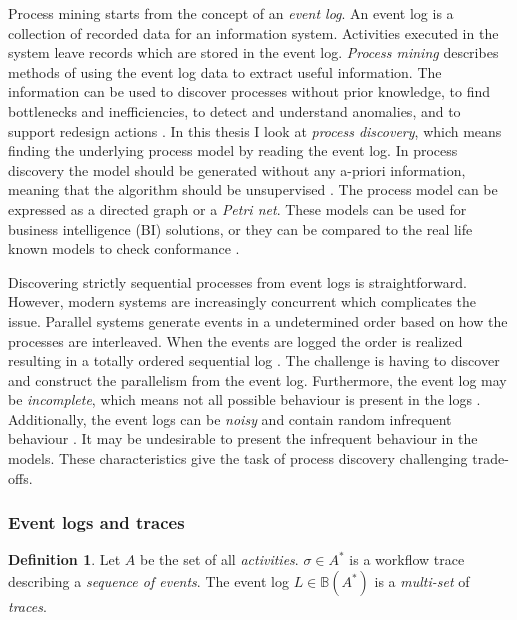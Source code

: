 \documentclass[english,12pt,a4paper,pdftex,sci,utf8]{aaltothesis}
\theoremstyle{definition}
\newtheorem{definition}{Definition}
\begin{document}
Process mining starts from the concept of an \emph{event log}.
An event log is a collection of recorded data for an information system.
Activities executed in the system leave records which are stored in the event log.
\emph{Process mining} describes methods of using the event log data to extract useful information.
The information can be used to discover processes without prior knowledge, to find bottlenecks and inefficiencies, to detect and understand anomalies, and to support redesign actions \cite{van2015extracting}.
In this thesis I look at \emph{process discovery}, which means finding the underlying process model
by reading the event log.
In process discovery the model should be generated without any a-priori information, meaning that the algorithm should be unsupervised \cite{van2013discovering}.
The process model can be expressed as a directed graph or a \emph{Petri net}.
These models can be used for business intelligence (BI) solutions, or they can be compared to the real life
known models to check conformance \cite{van2013discovering}.


Discovering strictly sequential processes from event logs is straightforward. However, modern systems are increasingly concurrent which complicates the issue. 
Parallel systems generate events in a undetermined order based on how the processes are interleaved. 
When the events are logged the order is realized resulting in a totally ordered sequential log \cite{van2004workflow}. 
The challenge is having to discover and construct the parallelism from the event log.
Furthermore, the event log may be \emph{incomplete}, which means not all possible behaviour is present in the logs \cite{van2013discovering}.
Additionally, the event logs can be \emph{noisy} and contain random infrequent behaviour \cite{van2013discovering}.
It may be undesirable to present the infrequent behaviour in the models.
These characteristics give the task of process discovery challenging trade-offs.

\subsubsection{Event logs and traces}

\label{sec:eventtheory}

\begin{definition}
Let $A$ be the set of all \emph{activities}. 
$\sigma \in A^*$ is a workflow trace describing a \emph{sequence of events}.
The event log $L \in \mathbb{B}(A^*)$ is a \emph{multi-set} of \emph{traces}.
\end{definition}
\end{document}
